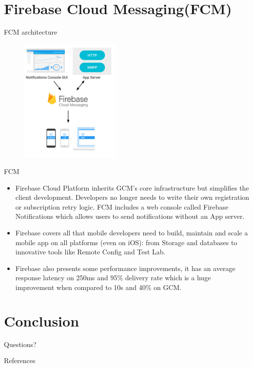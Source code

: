 \documentclass[10pt]{beamer}
\begin{document}
\section{Firebase Cloud Messaging(FCM)}
\begin{frame}[fragile]{FCM architecture}
\begin{figure}[!htb]
\centering
\includegraphics[width=5cm]{../report/images/fcm.png}
\end{figure}
\end{frame}
\begin{frame}[fragile]{FCM}
\begin{itemize}
\item Firebase Cloud Platform inherits GCM’s core infrastructure but simplifies the client development. Developers no longer needs to write their own registration or subscription retry logic. FCM includes a web console called Firebase Notifications which allows users to send notifications without an App server.
\item Firebase covers all that mobile developers need to build, maintain and scale a mobile app on all platforms (even on iOS): from Storage and databases to innovative tools like Remote Config and Test Lab.
\item Firebase also presents some performance improvements, it has an average response latency on 250ms and  95\% delivery rate which is a huge improvement when compared to 10s and 40\% on GCM.
\end{itemize}
\end{frame}
\section{Conclusion}
\begin{frame}[standout]
  Questions?
\end{frame}
\begin{frame}[allowframebreaks]{References}

  
  

\end{frame}
\end{document}
